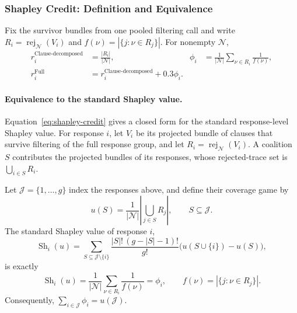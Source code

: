 \subsubsection{Shapley Credit: Definition and Equivalence}
\label{app:formal-shapley}

Fix the survivor bundles from one pooled filtering call and write
\(R_i=\operatorname{rej}_{\mathcal N}(V_i)\) and
\(f(\nu)=|\{j:\nu\in R_j\}|\).  For nonempty \(\mathcal N\),
\begin{equation}
  \begin{aligned}
  r_i^{\text{Clause-decomposed}}&=\frac{|R_i|}{|\mathcal N|},
  &\phi_i&=\frac{1}{|\mathcal N|}\sum_{\nu\in R_i}\frac{1}{f(\nu)},\\
  r_i^{\mathrm{Full}}&=r_i^{\text{Clause-decomposed}}+0.3\phi_i.
  \end{aligned}
  \label{eq:shapley-credit}
\end{equation}
\paragraph{Equivalence to the standard Shapley value.}
Equation~\eqref{eq:shapley-credit} gives a closed form for the standard
response-level Shapley value. For response \(i\), let \(V_i\)
be its projected bundle of clauses that survive filtering of the full response
group, and let \(R_i=\operatorname{rej}_{\mathcal N}(V_i)\).  A coalition
\(S\) contributes the projected bundles of its responses, whose rejected-trace
set is \(\bigcup_{i\in S}R_i\).

\begin{proposition}
\label{prop:shapley-closed-form}
Let \(\mathcal J=\{1,\ldots,g\}\) index the responses above, and define their coverage
game by
\[
  u(S)=\frac{1}{|\mathcal N|}\left|\bigcup_{j\in S}R_j\right|,
  \qquad S\subseteq\mathcal J.
\]
The standard Shapley value of response \(i\),
\begin{equation}
  \operatorname{Sh}_i(u)
  =\sum_{S\subseteq\mathcal J\setminus\{i\}}
    \frac{|S|!\,(g-|S|-1)!}{g!}
    \bigl(u(S\cup\{i\})-u(S)\bigr),
  \label{eq:standard-shapley}
\end{equation}
is exactly
\[
  \operatorname{Sh}_i(u)
  =\frac{1}{|\mathcal N|}
    \sum_{\nu\in R_i}\frac{1}{f(\nu)}
  =\phi_i,
  \qquad
  f(\nu)=|\{j:\nu\in R_j\}|.
\]
Consequently, \(\sum_{i\in\mathcal J}\phi_i=u(\mathcal J)\).
\end{proposition}

